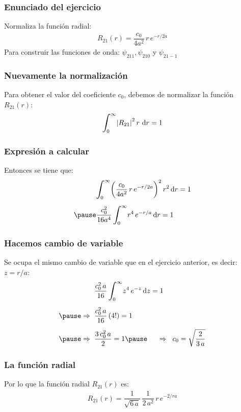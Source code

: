 \documentclass[12pt]{beamer}
\begin{document}
\begin{frame}
\frametitle{Enunciado del ejercicio}
Normaliza la función radial:
\begin{align*}
R_{21} (r) = \dfrac{c_{0}}{4 a^{2}} \, r \, e^{-r/2a}
\end{align*}
\pause
Para construir las funciones de onda: $\psi_{211}, \psi_{210}$ y $\psi_{21-1}$
\end{frame}
\begin{frame}
\frametitle{Nuevamente la normalización}
Para obtener el valor del coeficiente $c_{0}$, debemos de normalizar la función $R_{21} (r)$:
\pause
\begin{align*}
\scaleint{6ex}_{\bs 0}^{\infty} \abs{R_{21}}^{2} \, r \, \dd{r} = 1
\end{align*}
\end{frame}
\begin{frame}
\frametitle{Expresión a calcular}
Entonces se tiene que:
\pause
\begin{eqnarray*}
\begin{aligned}
&\scaleint{6ex}_{\bs 0}^{\infty} \bigg( \dfrac{c_{0}}{4 a^{2}} \, r \, e^{-r/2a} \bigg)^{2} \, r^{2} \dd{r} = 1 \\[0.5em] \pause
&\dfrac{c_{0}^{2}}{16 a^{4}} \, \scaleint{6ex}_{\bs 0}^{\infty}  r^{4} \, e^{-r/a} \dd{r} = 1
\end{aligned}
\end{eqnarray*}
\end{frame}
\begin{frame}
\frametitle{Hacemos cambio de variable}
Se ocupa el mismo cambio de variable que en el ejercicio anterior, es decir: $z = r/a$:
\pause
\begin{eqnarray*}
\begin{aligned}
&\dfrac{c_{0}^{2} \, a}{16} \, \scaleint{6ex}_{\bs 0}^{\infty}  z^{4} \, e^{-z} \dd{z} = 1 \\[0.5em] \pause
\Rightarrow \hspace{0.2cm} &\dfrac{c_{0}^{2} \, a}{16} \, (4!) = 1 \\[0.5em] \pause
\Rightarrow \hspace{0.2cm} &\dfrac{3 \, c_{0}^{2} \, a}{2} = 1 \pause \hspace{0.5cm} \Rightarrow \hspace{0.2cm} c_{0} = \sqrt{\dfrac{2}{3 \, a}}
\end{aligned}
\end{eqnarray*}
\end{frame}
\begin{frame}
\frametitle{La función radial}
Por lo que la función radial $R_{21} (r)$ es:
\pause
\begin{align*}
R_{21} (r) = \dfrac{1}{\sqrt{6 \, a}} \, \dfrac{1}{2 \, a^{2}} \, r \, e^{-2/ra}
\end{align*}
\end{frame}
\end{document}
